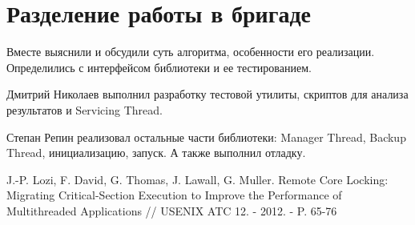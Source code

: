 \documentclass[a4paper,14pt]{extarticle}
\begin{document}

\section{Разделение работы в бригаде}

Вместе выяснили и обсудили суть алгоритма, особенности его реализации.
Определились с интерфейсом библиотеки и ее тестированием.

Дмитрий Николаев выполнил разработку тестовой утилиты, скриптов для анализа
результатов и Servicing Thread.

Степан Репин реализовал остальные части библиотеки: Manager Thread, Backup
Thread, инициализацию, запуск. А также выполнил отладку.

\begingroup
\renewcommand{\section}[2]{\anonsection{Список использованных источников}}
\begin{thebibliography}{00}

    J.-P. Lozi, F. David, G. Thomas, J. Lawall, G. Muller. Remote Core Locking:
    Migrating Critical-Section Execution to Improve the Performance of
    Multithreaded Applications // USENIX ATC 12. - 2012. - P. 65-76

\end{thebibliography}
\endgroup
\end{document}

